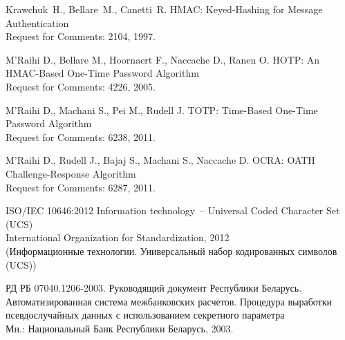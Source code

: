 \clearpage
\begin{thebibliography}{999}
Krawchuk~H., Bellare~M., Canetti~R.
HMAC: Keyed-Hashing for Message Authentication\\
{\small Request for Comments: 2104, 1997.}

M'Raihi D., 
Bellare M.,
Hoornaert F.,
Naccache D.,
Ranen O.
HOTP: An HMAC-Based One-Time Password Algorithm\\
{\small Request for Comments: 4226, 2005.}

M'Raihi D., 
Machani S.,
Pei M.,
Rudell J.
TOTP: Time-Based One-Time Password Algorithm\\
{\small Request for Comments: 6238, 2011.}

M'Raihi D., 
Rudell J.,
Bajaj S.,
Machani S.,
Naccache D.
OCRA: OATH Challenge-Response Algorithm\\
{\small Request for Comments: 6287, 2011.}

ISO/IEC 10646:2012
Information technology~-- Universal Coded Character Set (UCS)\\
{\small International Organization for Standardization, 2012}\\
{\small (Информационные технологии. 
Универсальный набор кодированных символов (UCS))}

РД РБ 07040.1206-2003. 
Руководящий документ Республики Беларусь. 
Автоматизированная система межбанковских расчетов. 
Процедура выработки псевдослучайных данных с использованием 
секретного параметра\\
{\small Мн.: Национальный Банк Республики Беларусь, 2003.}

\label{LastBib}
\end{thebibliography}

